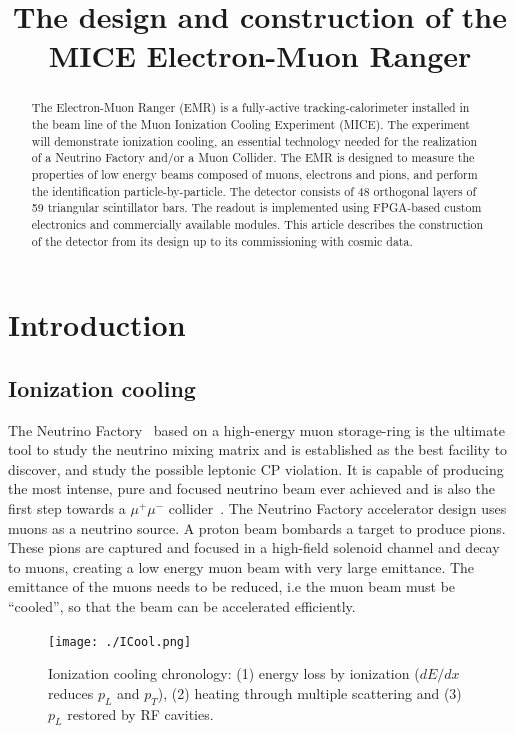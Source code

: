 \documentclass[a4paper,11pt]{article}
\title{The design and construction of the MICE Electron-Muon Ranger}
\author{}
\begin{document}
\maketitle

\begin{abstract}
The Electron-Muon Ranger (EMR) is a fully-active tracking-calorimeter installed in the beam line of the Muon Ionization
Cooling Experiment (MICE). The experiment will demonstrate ionization cooling, an essential technology needed
for the realization of a Neutrino Factory and/or a Muon Collider. The EMR is designed to measure the properties of low
energy beams composed of muons, electrons and pions, and perform the identification particle-by-particle. The detector consists of 48 orthogonal layers of 59 triangular scintillator
bars. 
The readout is implemented using FPGA-based custom electronics and commercially available modules. This article describes
the construction of the detector from its design up to its commissioning with cosmic data.
\end{abstract}

\section{Introduction}
\subsection{Ionization cooling}
The Neutrino Factory~\cite{NFReference, nf} based on a high-energy muon storage-ring is the ultimate tool to study the neutrino mixing matrix
and is established as the best facility to discover, and study the possible leptonic CP violation. It is capable of producing the
most intense, pure and focused neutrino beam ever achieved and is also the first step towards a $\mu^+ \mu^-$ collider~\cite{Neuffer:multitev, Palmer:1996gs}.
The Neutrino Factory accelerator design uses muons as a neutrino source. A proton beam bombards
a target to produce pions. These pions are captured and focused in a high-field solenoid channel and decay
to muons, creating a low energy muon beam with very large emittance.  The emittance of the muons needs to be reduced,
i.e the muon beam must be “cooled”, so that the beam can be accelerated efficiently.

\begin{figure}[htb]
 \texttt{[image: ./ICool.png]}
 \caption{Ionization cooling chronology: (1) energy loss by ionization ($dE/dx$ reduces $p_L$ and $p_T$),
    (2) heating through multiple scattering and
    (3) $p_L$ restored by RF cavities.
   }
 \label{fig:icool}     
\end{figure}
\end{document}
